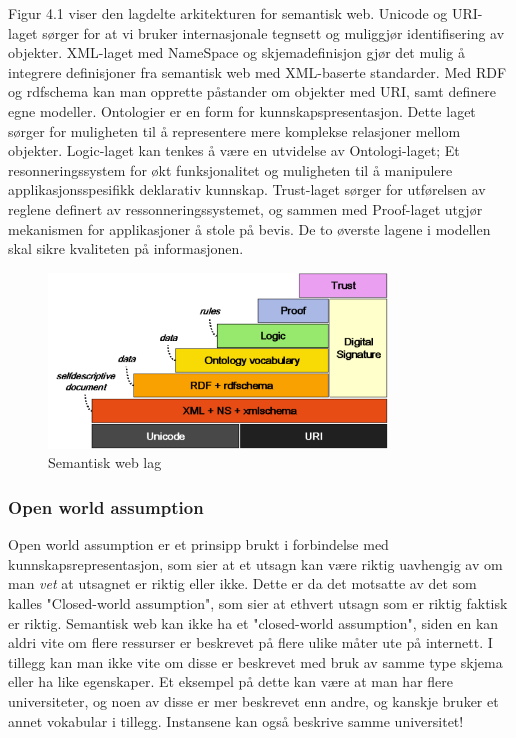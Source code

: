 Figur 4.1 viser den lagdelte arkitekturen for semantisk web. Unicode og URI-laget sørger for at vi bruker internasjonale tegnsett og muliggjør identifisering av objekter. XML-laget med NameSpace og skjemadefinisjon gjør det mulig å integrere definisjoner fra semantisk web med XML-baserte standarder. Med RDF og rdfschema kan man opprette påstander om objekter med URI, samt definere egne modeller. Ontologier er en form for kunnskapspresentasjon. Dette laget sørger for muligheten til å representere mere komplekse relasjoner mellom objekter. Logic-laget kan tenkes å være en utvidelse av Ontologi-laget; Et resonneringssystem for økt funksjonalitet og muligheten til å manipulere applikasjonsspesifikk deklarativ kunnskap. Trust-laget sørger for utførelsen av reglene definert av ressonneringssystemet, og sammen med Proof-laget utgjør mekanismen for applikasjoner å stole på bevis. De to øverste lagene i modellen skal sikre kvaliteten på informasjonen.

\begin{figure}[H]
\centering
\includegraphics[width=90mm]{images/swlevels.png}
\caption{Semantisk web lag }
\end{figure}

\subsubsection{Open world assumption}
Open world assumption er et prinsipp brukt i forbindelse med kunnskapsrepresentasjon, som sier at et utsagn kan være riktig uavhengig av om man \textit{vet} at utsagnet er riktig eller ikke. Dette er da det motsatte av det som kalles "Closed-world assumption", som sier at ethvert utsagn som er riktig faktisk er riktig. Semantisk web kan ikke ha et "closed-world assumption", siden en kan aldri vite om flere ressurser er beskrevet på flere ulike måter ute på internett. I tillegg kan man ikke vite om disse er beskrevet med bruk av samme type skjema eller ha like egenskaper. Et eksempel på dette kan være at man har flere universiteter, og noen av disse er mer beskrevet enn andre, og kanskje bruker et annet vokabular i tillegg. Instansene kan også beskrive samme universitet! 

